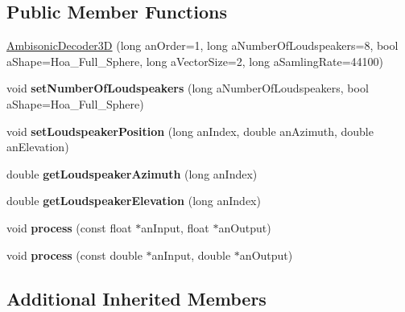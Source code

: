 \subsection*{Public Member Functions}
\begin{DoxyCompactItemize}
\item 
\hyperlink{class_ambisonic_decoder3_d_a500aa4620487dc857bd1c2c89acfe874}{Ambisonic\-Decoder3\-D} (long an\-Order=1, long a\-Number\-Of\-Loudspeakers=8, bool a\-Shape=Hoa\-\_\-\-Full\-\_\-\-Sphere, long a\-Vector\-Size=2, long a\-Samling\-Rate=44100)
\item 
\hypertarget{class_ambisonic_decoder3_d_a910db37deb4ad6fd574a43d692888842}{void {\bfseries set\-Number\-Of\-Loudspeakers} (long a\-Number\-Of\-Loudspeakers, bool a\-Shape=Hoa\-\_\-\-Full\-\_\-\-Sphere)}\label{class_ambisonic_decoder3_d_a910db37deb4ad6fd574a43d692888842}

\item 
\hypertarget{class_ambisonic_decoder3_d_a646c9ad31367db67b001964be4692145}{void {\bfseries set\-Loudspeaker\-Position} (long an\-Index, double an\-Azimuth, double an\-Elevation)}\label{class_ambisonic_decoder3_d_a646c9ad31367db67b001964be4692145}

\item 
\hypertarget{class_ambisonic_decoder3_d_a5942ef0cad58db519d4bc28d7422b3fc}{double {\bfseries get\-Loudspeaker\-Azimuth} (long an\-Index)}\label{class_ambisonic_decoder3_d_a5942ef0cad58db519d4bc28d7422b3fc}

\item 
\hypertarget{class_ambisonic_decoder3_d_a90aff96227bfdbde571bb26998af9750}{double {\bfseries get\-Loudspeaker\-Elevation} (long an\-Index)}\label{class_ambisonic_decoder3_d_a90aff96227bfdbde571bb26998af9750}

\item 
\hypertarget{class_ambisonic_decoder3_d_adb378983f0ac5c5dbb27f69f02fd2993}{void {\bfseries process} (const float $\ast$an\-Input, float $\ast$an\-Output)}\label{class_ambisonic_decoder3_d_adb378983f0ac5c5dbb27f69f02fd2993}

\item 
\hypertarget{class_ambisonic_decoder3_d_aacbe0f5139bc59edd8b12693d84388b6}{void {\bfseries process} (const double $\ast$an\-Input, double $\ast$an\-Output)}\label{class_ambisonic_decoder3_d_aacbe0f5139bc59edd8b12693d84388b6}

\end{DoxyCompactItemize}
\subsection*{Additional Inherited Members}


